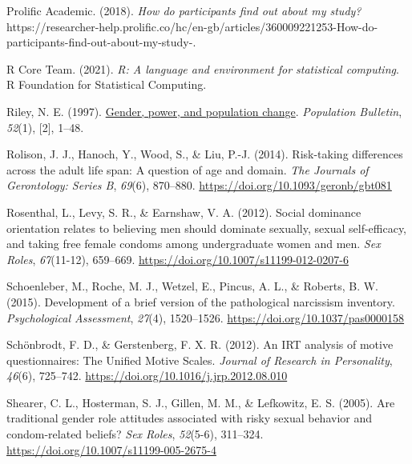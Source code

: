 \documentclass[
  donotrepeattitle,doc, 12pt, a4paper,floatsintext]{apa7}
\newlength{\cslhangindent}
\newlength{\cslentryspacingunit} %
\newenvironment{CSLReferences}[2] %
 {%
  \setlength{\parindent}{0pt}
  \ifodd #1
  \let\oldpar\par
  \def\par{\hangindent=\cslhangindent\oldpar}
  \fi
  \setlength{\parskip}{#2\cslentryspacingunit}
 }%
 {}
\begin{document}
\begin{CSLReferences}{1}{0}
\leavevmode{}%
Prolific Academic. (2018). \emph{How do participants find out about my study?} https://researcher-help.prolific.co/hc/en-gb/articles/360009221253-How-do-participants-find-out-about-my-study-.

\leavevmode{}%
R Core Team. (2021). \emph{R: {A} language and environment for statistical computing}. R Foundation for Statistical Computing.

\leavevmode{}%
Riley, N. E. (1997). \href{https://www.ncbi.nlm.nih.gov/pubmed/12320868}{Gender, power, and population change}. \emph{Population Bulletin}, \emph{52}(1), {[}2{]}, 1--48.

\leavevmode{}%
Rolison, J. J., Hanoch, Y., Wood, S., \& Liu, P.-J. (2014). Risk-taking differences across the adult life span: A question of age and domain. \emph{The Journals of Gerontology: Series B}, \emph{69}(6), 870--880. \url{https://doi.org/10.1093/geronb/gbt081}

\leavevmode{}%
Rosenthal, L., Levy, S. R., \& Earnshaw, V. A. (2012). Social dominance orientation relates to believing men should dominate sexually, sexual self-efficacy, and taking free female condoms among undergraduate women and men. \emph{Sex Roles}, \emph{67}(11-12), 659--669. \url{https://doi.org/10.1007/s11199-012-0207-6}

\leavevmode{}%
Schoenleber, M., Roche, M. J., Wetzel, E., Pincus, A. L., \& Roberts, B. W. (2015). Development of a brief version of the pathological narcissism inventory. \emph{Psychological Assessment}, \emph{27}(4), 1520--1526. \url{https://doi.org/10.1037/pas0000158}

\leavevmode{}%
Schönbrodt, F. D., \& Gerstenberg, F. X. R. (2012). An {IRT} analysis of motive questionnaires: {The Unified Motive Scales}. \emph{Journal of Research in Personality}, \emph{46}(6), 725--742. \url{https://doi.org/10.1016/j.jrp.2012.08.010}

\leavevmode{}%
Shearer, C. L., Hosterman, S. J., Gillen, M. M., \& Lefkowitz, E. S. (2005). Are traditional gender role attitudes associated with risky sexual behavior and condom-related beliefs? \emph{Sex Roles}, \emph{52}(5-6), 311--324. \url{https://doi.org/10.1007/s11199-005-2675-4}


\end{CSLReferences}
\end{document}
